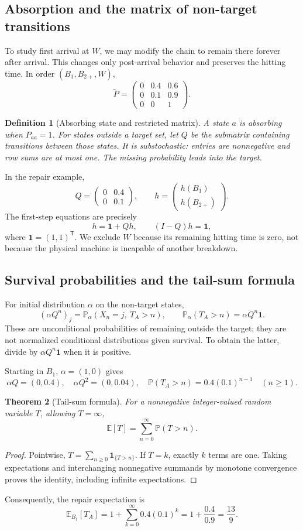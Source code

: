 \documentclass[11pt]{article}
\newtheorem{definition}{Definition}[section]
\newtheorem{theorem}[definition]{Theorem}
\theoremstyle{remark}\newtheorem{remark}[definition]{Remark}
\newcommand{\E}{\mathbb E}\newcommand{\Prob}{\mathbb P}
\begin{document}
\clearpage
\subsection{Absorption and the matrix of non-target transitions}
To study first arrival at $W$, we may modify the chain to remain there forever after arrival. This changes only post-arrival behavior and preserves the hitting time. In order $(B_1,B_{2+},W)$,
\[
\widetilde P=\begin{pmatrix}0&0.4&0.6\\0&0.1&0.9\\0&0&1\end{pmatrix}.
\]
\begin{definition}[Absorbing state and restricted matrix]
A state $a$ is absorbing when $P_{aa}=1$. For states outside a target set, let $Q$ be the submatrix containing transitions between those states. It is substochastic: entries are nonnegative and row sums are at most one. The missing probability leads into the target.
\end{definition}
In the repair example,
\[
Q=\begin{pmatrix}0&0.4\\0&0.1\end{pmatrix},\qquad
h=\begin{pmatrix}h(B_1)\\h(B_{2+})\end{pmatrix}.
\]
The first-step equations are precisely
\[
\boxed{h=\mathbf1+Qh,\qquad (I-Q)h=\mathbf1,}
\]
where $\mathbf1=(1,1)^{\mathsf T}$. We exclude $W$ because its remaining hitting time is zero, not because the physical machine is incapable of another breakdown.

\subsection{Survival probabilities and the tail-sum formula}
For initial distribution $\alpha$ on the non-target states,
\[
(\alpha Q^n)_j=\Prob_\alpha(X_n=j,\ T_A>n),\qquad
\boxed{\Prob_\alpha(T_A>n)=\alpha Q^n\mathbf1.}
\]
These are unconditional probabilities of remaining outside the target; they are not normalized conditional distributions given survival. To obtain the latter, divide by $\alpha Q^n\mathbf1$ when it is positive.

Starting in $B_1$, $\alpha=(1,0)$ gives
\[
\alpha Q=(0,0.4),\quad \alpha Q^2=(0,0.04),\quad
\Prob(T_A>n)=0.4(0.1)^{n-1}\quad(n\geq1).
\]
\begin{theorem}[Tail-sum formula]
For a nonnegative integer-valued random variable $T$, allowing $T=\infty$,
\[
\E[T]=\sum_{n=0}^\infty\Prob(T>n).
\]
\end{theorem}
\begin{proof}
Pointwise, $T=\sum_{n\geq0}\mathbf1_{\{T>n\}}$. If $T=k$, exactly $k$ terms are one. Taking expectations and interchanging nonnegative summands by monotone convergence proves the identity, including infinite expectations.
\end{proof}
Consequently, the repair expectation is
\[
\E_{B_1}[T_A]=1+\sum_{k=0}^\infty0.4(0.1)^k
=1+\frac{0.4}{0.9}=\frac{13}{9}.
\]
\end{document}

